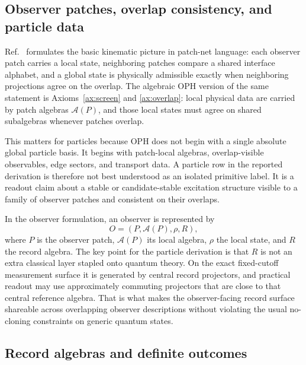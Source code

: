 \documentclass[11pt]{article}
\begin{document}
\subsection{Observer patches, overlap consistency, and particle data}

Ref.~\cite{ophconsensus} formulates the basic kinematic picture in patch-net language: each observer
patch carries a local state, neighboring patches compare a shared interface alphabet, and a
global state is physically admissible exactly when neighboring projections agree on the overlap.
The algebraic OPH version of the same statement is Axioms~\ref{ax:screen} and
\ref{ax:overlap}: local physical data are carried by patch algebras \(\mathcal A(P)\), and those local
states must agree on shared subalgebras whenever patches overlap.

This matters for particles because OPH does not begin with a single absolute global particle
basis. It begins with patch-local algebras, overlap-visible observables, edge sectors, and
transport data. A particle row in the reported derivation is therefore not best
understood as an isolated primitive label. It is a readout claim about a stable or
candidate-stable excitation structure visible to a family of observer patches and consistent on
their overlaps.

In the observer formulation, an observer is represented by
\[
O=(P,\mathcal A(P),\rho,R),
\]
where \(P\) is the observer patch, \(\mathcal A(P)\) its local algebra, \(\rho\) the local
state, and \(R\) the record algebra. The key point for the particle derivation is that \(R\) is not
an extra classical layer stapled onto quantum theory. On the exact fixed-cutoff measurement
surface it is generated by central record projectors, and practical readout may use
approximately commuting projectors that are close to that central reference algebra. That is what
makes the observer-facing record surface shareable across overlapping observer descriptions
without violating the usual no-cloning constraints on generic quantum states.

\subsection{Record algebras and definite outcomes}
\end{document}
